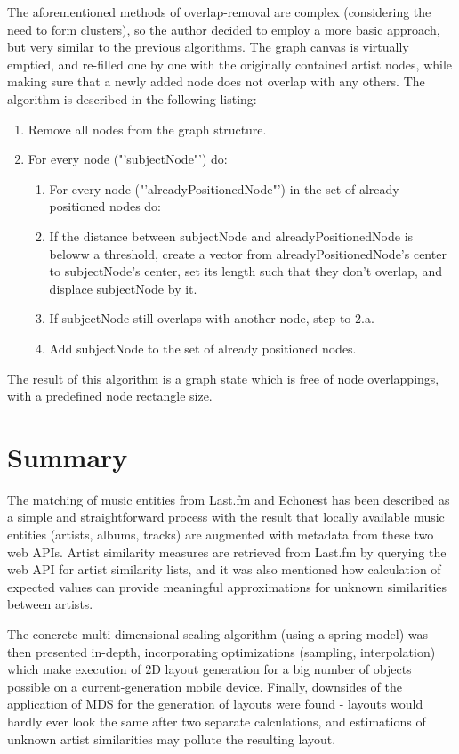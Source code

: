 The aforementioned methods of overlap-removal are complex (considering the need to form clusters), so the author decided to employ a more basic approach, but very similar to the previous algorithms. The graph canvas is virtually emptied, and re-filled one by one with the originally contained artist nodes, while making sure that a newly added node does not overlap with any others. The algorithm is described in the following listing:

\begin{enumerate}
\item Remove all nodes from the graph structure.	
\item For every node ("'subjectNode"') do:
	\begin{enumerate}
		\item For every node ("'alreadyPositionedNode"') in the set of already positioned nodes do:
		\item If the distance between subjectNode and alreadyPositionedNode is beloww a
		threshold, create a vector from alreadyPositionedNode's center to subjectNode's center, set
		its length such that they don't overlap, and displace subjectNode by it.
		\item If subjectNode still overlaps with another node, step to 2.a.
		\item Add subjectNode to the set of already positioned nodes.
	\end{enumerate}
\end{enumerate}

The result of this algorithm is a graph state which is free of node overlappings, with a predefined node rectangle size.

\section{Summary}

The matching of music entities from Last.fm and Echonest has been described as a simple and straightforward process with the result that locally available music entities (artists, albums, tracks) are augmented with metadata from these two web APIs. Artist similarity measures are retrieved from Last.fm by querying the web API for artist similarity lists, and it was also mentioned how calculation of expected values can provide meaningful approximations for unknown similarities between artists.

The concrete multi-dimensional scaling algorithm (using a spring model) was then presented in-depth, incorporating optimizations (sampling, interpolation) which make execution of 2D layout generation for a big number of objects possible on a current-generation mobile device. Finally, downsides of the application of MDS for the generation of layouts were found - layouts would hardly ever look the same after two separate calculations, and estimations of unknown artist similarities may pollute the resulting layout.